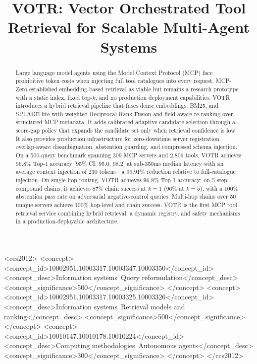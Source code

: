 \documentclass[sigconf,anonymous,review]{acmart}
\title{VOTR: Vector Orchestrated Tool Retrieval for Scalable Multi-Agent Systems}
\newcommand{\votr}{\textsc{VOTR}\xspace}
\newcommand{\mcpzero}{MCP-Zero\xspace}
\begin{document}
\begin{abstract}
Large language model agents using the Model Context Protocol (MCP) face prohibitive
token costs when injecting full tool catalogues into every request.
\mcpzero established embedding-based retrieval as viable but remains a research
prototype with a static index, fixed top-$k$, and no production deployment
capabilities.
\votr introduces a hybrid retrieval pipeline that fuses dense embeddings, BM25,
and SPLADE-lite with weighted Reciprocal Rank Fusion and field-aware re-ranking
over structured MCP metadata.
It adds calibrated adaptive candidate selection through a score-gap policy that
expands the candidate set only when retrieval confidence is low.
It also provides production infrastructure for zero-downtime server registration,
overlap-aware disambiguation, abstention guarding, and compressed schema injection.
On a 500-query benchmark spanning 309 MCP servers and 2,806 tools, \votr achieves
96.8\% Top-1 accuracy [95\% CI: 95.0, 98.2] at sub-350ms median latency with an
average context injection of 230 tokens---a 99.91\% reduction relative to
full-catalogue injection.
On single-hop routing, \votr achieves 96.8\% Top-1 accuracy; on 5-step compound
chains, it achieves 87\% chain success at $k=1$ (96\% at $k=5$), with a 100\%
abstention pass rate on adversarial negative-control queries.
Multi-hop chains over 50 unique servers achieve 100\% hop-level and chain success.
\votr is the first MCP tool retrieval service combining hybrid retrieval, a dynamic
registry, and safety mechanisms in a production-deployable architecture.
\end{abstract}

\begin{CCSXML}
<ccs2012>
  <concept>
    <concept_id>10002951.10003317.10003347.10003350</concept_id>
    <concept_desc>Information systems~Query reformulation</concept_desc>
    <concept_significance>500</concept_significance>
  </concept>
  <concept>
    <concept_id>10002951.10003317.10003325.10003326</concept_id>
    <concept_desc>Information systems~Retrieval models and ranking</concept_desc>
    <concept_significance>500</concept_significance>
  </concept>
  <concept>
    <concept_id>10010147.10010178.10010224</concept_id>
    <concept_desc>Computing methodologies~Autonomous agents</concept_desc>
    <concept_significance>300</concept_significance>
  </concept>
</ccs2012>
\end{CCSXML}
\end{document}
